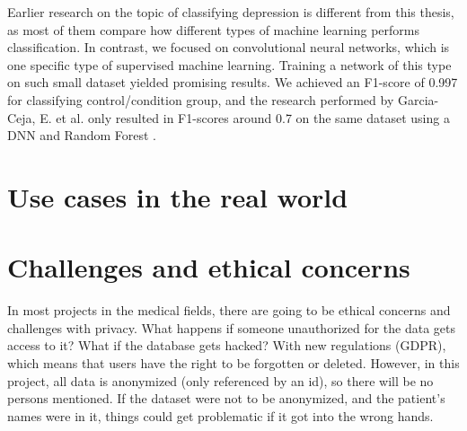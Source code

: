Earlier research on the topic of classifying depression is different from this thesis, as most of them compare how different types of machine learning performs classification. In contrast, we focused on convolutional neural networks, which is one specific type of supervised machine learning. Training a network of this type on such small dataset yielded promising results. We achieved an F1-score of 0.997 for classifying control/condition group, and the research performed by Garcia-Ceja, E. et al. only resulted in F1-scores around 0.7 on the same dataset using a DNN and Random Forest \cite{GarciaCeja2018_classification_bipolar}. 

\section{Use cases in the real world}



\section{Challenges and ethical concerns}
In most projects in the medical fields, there are going to be ethical concerns and challenges with privacy. What happens if someone unauthorized for the data gets access to it? What if the database gets hacked? With new regulations (GDPR), which means that users have the right to be forgotten or deleted. However, in this project, all data is anonymized (only referenced by an id), so there will be no persons mentioned. If the dataset were not to be anonymized, and the patient's names were in it, things could get problematic if it got into the wrong hands. 
